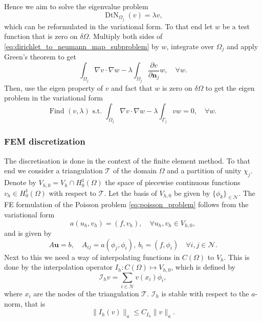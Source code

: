 Hence we aim to solve the eigenvalue problem
\[
    \operatorname{DtN}_{\Omega_j}\left(v\right) = \lambda v,
\]
which can be reformulated in the variational form. To that end let $w$ be a test function that is zero on $\delta \Omega$. Multiply both sides of \cref{eq:dirichlet_to_neumann_map_subproblem} by $w$, integrate over $\Omega_j$ and apply Green's theorem to get
\[
    \int_{\Omega_j} \nabla v \cdot \nabla w - \lambda \int_{\Omega_j} \frac{\partial v}{\partial \mathbf{n}_j}w, \quad \forall w.
\]
Then, use the eigen property of $v$ and fact that $w$ is zero on $\delta \Omega$ to get the eigen problem in the variational form
\begin{equation}
    \text{Find } (v, \lambda) \text{ s.t. } \int_{\Omega_j} \nabla v \cdot \nabla w - \lambda \int_{\Gamma_j} vw = 0, \quad \forall w.
    \label{eq:dirichlet_to_neumann_map_eigenproblem}
\end{equation}

\subsubsection{FEM discretization}
The discretisation is done in the context of the finite element method. To that end we consider a triangulation $\mathcal{T}$ of the domain $\Omega$ and a partition of unity $\chi_j$. Denote by $V_{h,0} = V_h \cap H^1_0(\Omega)$ the space of piecewise continuous functions $v_h\in H^1_0(\Omega)$ with respect to $\mathcal{T}$. Let the basis of $V_{h,0}$ be given by $\{\phi_k\}_{\in\mathcal{N}}$. The FE formulation of the Poisson problem \cref{eq:poisson_problem} follows from the variational form
\[
    a(u_h, v_h) = (f, v_h), \quad \forall u_h, v_h \in V_{h,0},
\]
and is given by
\begin{equation}
    A\mathbf{u} = b, \quad A_{ij} = a(\phi_j, \phi_i), \ b_i = (f, \phi_i) \quad \forall i,j\in\mathcal{N}.
\end{equation}
Next to this we need a way of interpolating functions in $C(\Omega)$ to $V_{h}$. This is done by the interpolation operator $I_h: C(\Omega) \mapsto V_{h,0}$, which is defined by
\[
    \mathcal{I}_h v = \sum_{i\in\mathcal{N}} v(x_i) \phi_i,
\]
where $x_i$ are the nodes of the triangulation $\mathcal{T}$. $\mathcal{I}_h$ is stable with respect to the $a$-norm, that is
\[
    \| I_h(v) \|_a \leq C_{I_h} \| v \|_{a}.
\]

